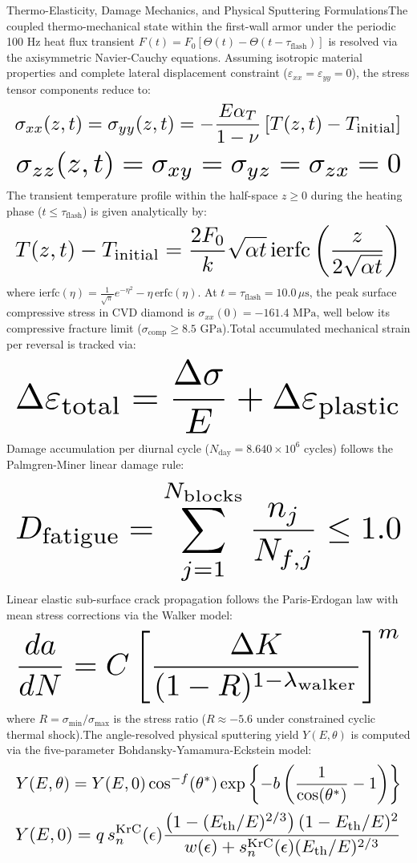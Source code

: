 Thermo-Elasticity, Damage Mechanics, and Physical Sputtering FormulationsThe coupled thermo-mechanical state within the first-wall armor under the periodic 100 Hz heat flux transient $F(t) = F_0 \left[ \Theta(t) - \Theta(t - \tau_{\text{flash}}) \right]$ is resolved via the axisymmetric Navier-Cauchy equations. Assuming isotropic material properties and complete lateral displacement constraint ($\varepsilon_{xx} = \varepsilon_{yy} = 0$), the stress tensor components reduce to:\[
\resizebox{\columnwidth}{!}{$\displaystyle \sigma_{xx}(z, t) = \sigma_{yy}(z, t) = - \frac{E \alpha_T}{1 - \nu} \left[ T(z, t) - T_{\text{initial}} \right]$}
\]
\[
\resizebox{\columnwidth}{!}{$\displaystyle \sigma_{zz}(z, t) = \sigma_{xy} = \sigma_{yz} = \sigma_{zx} = 0$}
\]
The transient temperature profile within the half-space $z \ge 0$ during the heating phase ($t \le \tau_{\text{flash}}$) is given analytically by:\[
\resizebox{\columnwidth}{!}{$\displaystyle T(z, t) - T_{\text{initial}} = \frac{2 F_0}{k} \sqrt{\alpha t} \, \text{ierfc}\left( \frac{z}{2 \sqrt{\alpha t}} \right)$}
\]
where $\text{ierfc}(\eta) = \frac{1}{\sqrt{\pi}} e^{-\eta^2} - \eta \, \text{erfc}(\eta)$. At $t = \tau_{\text{flash}} = 10.0\,\mu\text{s}$, the peak surface compressive stress in CVD diamond is $\sigma_{xx}(0) = -161.4\text{ MPa}$, well below its compressive fracture limit ($\sigma_{\text{comp}} \ge 8.5\text{ GPa}$).Total accumulated mechanical strain per reversal is tracked via:\[
\resizebox{\columnwidth}{!}{$\displaystyle \Delta \varepsilon_{\text{total}} = \frac{\Delta \sigma}{E} + \Delta \varepsilon_{\text{plastic}}$}
\]
Damage accumulation per diurnal cycle ($N_{\text{day}} = 8.640 \times 10^6\text{ cycles}$) follows the Palmgren-Miner linear damage rule:\[
\resizebox{\columnwidth}{!}{$\displaystyle D_{\text{fatigue}} = \sum_{j=1}^{N_{\text{blocks}}} \frac{n_j}{N_{f, j}} \le 1.0$}
\]
Linear elastic sub-surface crack propagation follows the Paris-Erdogan law with mean stress corrections via the Walker model:\[
\resizebox{\columnwidth}{!}{$\displaystyle \frac{da}{dN} = C \left[ \frac{\Delta K}{(1 - R)^{1 - \lambda_{\text{walker}}}} \right]^m$}
\]
where $R = \sigma_{\text{min}} / \sigma_{\text{max}}$ is the stress ratio ($R \approx -5.6$ under constrained cyclic thermal shock).The angle-resolved physical sputtering yield $Y(E, \theta)$ is computed via the five-parameter Bohdansky-Yamamura-Eckstein model:\[
\resizebox{\columnwidth}{!}{$\displaystyle Y(E, \theta) = Y(E, 0) \cos^{-f}(\theta^*) \exp\left\{ - b \left( \frac{1}{\cos(\theta^*)} - 1 \right) \right\}$}
\]
\[
\resizebox{\columnwidth}{!}{$\displaystyle Y(E, 0) = q \, s_n^{\text{KrC}}(\epsilon) \frac{\left( 1 - (E_{\text{th}} / E)^{2/3} \right) (1 - E_{\text{th}} / E)^2}{w(\epsilon) + s_n^{\text{KrC}}(\epsilon) (E_{\text{th}} / E)^{2/3}}$}
\]
